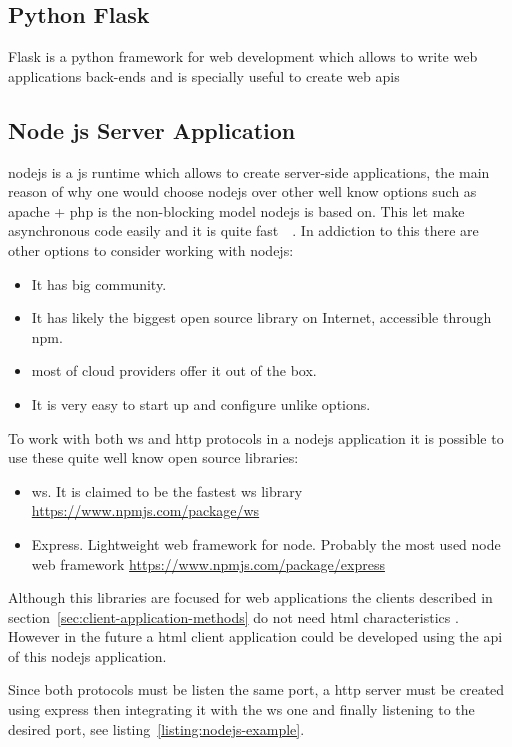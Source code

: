 \documentclass[hidelinks,11pt,a4paper,oneside,article]{memoir}
\begin{document}
\subsection{Python Flask}
Flask is a \gls{python} framework for web development which allows to write web applications back-ends and is specially useful to create web \gls{api}s 

\subsection{Node js Server Application}
\gls{nodejs} is a \gls{js} runtime which allows to create server-side applications, the main reason of why one would choose \gls{nodejs} over other well know options such as \gls{apache} + \gls{php} is the non-blocking model \gls{nodejs} is based on. This let make asynchronous code easily and it is quite fast~\cite[p.12]{nodejs}~\cite{nodeblocking}.
In addiction to this there are other options to consider working with \gls{nodejs}:
\begin{itemize}
    \item It has big community.
    \item It has likely the biggest open source library on Internet, accessible through \gls{npm}.
    \item most of cloud providers offer it out of the box.
    \item It is very easy to start up and configure unlike options.
\end{itemize}
To work with both \gls{ws} and \gls{http} protocols in a \gls{nodejs} application it is possible to use these quite well know open source libraries:

\begin{itemize}
    \item ws. It is claimed to be the fastest \gls{ws} library \url{https://www.npmjs.com/package/ws}
    \item Express. Lightweight web framework for node. Probably the most used node web framework \url{https://www.npmjs.com/package/express}
\end{itemize}
Although this libraries are focused for web applications the clients described in section~\ref{sec:client-application-methods} do not need \gls{html} characteristics . However in the future a \gls{html} client application could be developed using the \gls{api} of this \gls{nodejs} application.

Since both protocols must be listen the same port, a \gls{http} server must be created using express then integrating it with the \gls{ws} one and finally listening to the desired port, see listing~\ref{listing:nodejs-example}.
\end{document}
